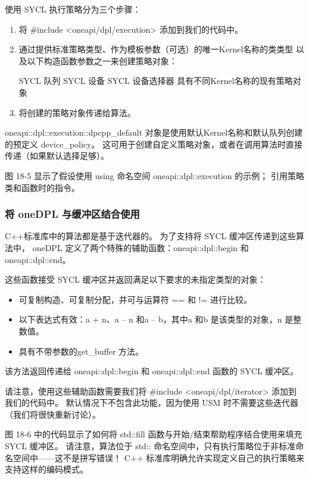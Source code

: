使用 SYCL 执行策略分为三个步骤：

\begin{enumerate}
	\item 将 \#include <oneapi/dpl/execution> 添加到我们的代码中。

	\item 通过提供标准策略类型、作为模板参数（可选）的唯一Kernel名称的类类型
	以及以下构造函数参数之一来创建策略对象：

		SYCL 队列 SYCL 设备 SYCL 设备选择器 具有不同Kernel名称的现有策略对象

	\item 将创建的策略对象传递给算法。
\end{enumerate}

oneapi::dpl::execution::dpcpp\_default 对象是使用默认Kernel名称和默认队列创建的预定义 device\_policy。 
这可用于创建自定义策略对象，或者在调用算法时直接传递（如果默认选择足够）。

图 18-5 显示了假设使用 using 命名空间 oneapi::dpl::execution 的示例； 引用策略类和函数时的指令。

\subsubsection{将 oneDPL 与缓冲区结合使用}
C++标准库中的算法都是基于迭代器的。 为了支持将 SYCL 缓冲区传递到这些算法中，
oneDPL 定义了两个特殊的辅助函数：oneapi::dpl::begin 和 oneapi::dpl::end。

这些函数接受 SYCL 缓冲区并返回满足以下要求的未指定类型的对象：

\begin{itemize}
	\item 可复制构造、可复制分配，并可与运算符 == 和 != 进行比较。

	\item 以下表达式有效：a + n、a – n 和a – b，其中a 和b 是该类型的对象，n 是整数值。

	\item 具有不带参数的get\_buffer 方法。
\end{itemize}

该方法返回传递给 oneapi::dpl::begin 和 oneapi::dpl::end 函数的 SYCL 缓冲区。

请注意，使用这些辅助函数需要我们将 \#include <oneapi/dpl/iterator> 添加到我们的代码中。 
默认情况下不包含此功能，因为使用 USM 时不需要这些迭代器（我们将很快重新讨论）。

图 18-6 中的代码显示了如何将 std::fill 函数与开始/结束帮助程序结合使用来填充 SYCL 缓冲区。 
请注意，算法位于 std:: 命名空间中，只有执行策略位于非标准命名空间中——这不是拼写错误！ 
C++ 标准库明确允许实现定义自己的执行策略来支持这样的编码模式。

